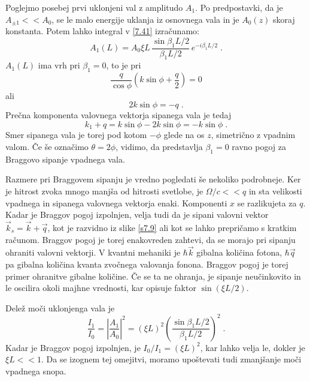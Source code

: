 \documentclass[11pt,fleqn]{book} %
\begin{document}
Poglejmo posebej prvi uklonjeni val z amplitudo $A_{1}$. Po predpostavki,
da je $A_{\pm1}<<A_{0}$, se le malo energije uklanja iz osnovnega
vala in je $A_{0}(z)$ skoraj konstanta. Potem lahko integral v \ref{7.41}
izračunamo: 
\begin{equation}
A_{1}(L)=A_{0}\xi L\,\frac{\sin\beta_{1}L/2}{\beta_{1}L/2}\, e^{-i\beta_{1}L/2}\;.\label{7.41}
\end{equation}
 $A_{1}(L)$ ima vrh pri $\beta_{1}=0$, to je pri 
\begin{equation}
\frac{q}{\cos\phi}(k\sin\phi+\frac{q}{2})=0\label{7.42}
\end{equation}
 ali 
\begin{equation}
2k\sin\phi=-q\;.\label{7.43}
\end{equation}
 Prečna komponenta valovnega vektorja sipanega vala je tedaj 
\begin{equation}
k_{1}+q=k\sin\phi-2k\sin\phi=-k\sin\phi\;.\label{7.44}
\end{equation}
 Smer sipanega vala je torej pod kotom $-\phi$ glede na os $z$,
simetrično z vpadnim valom. Če še označimo $\theta=2\phi$, vidimo,
da predstavlja $\beta_{1}=0$ ravno pogoj za Braggovo sipanje vpadnega
vala.

Razmere pri Braggovem sipanju je vredno pogledati še nekoliko podrobneje.
Ker je hitrost zvoka mnogo manjša od hitrosti svetlobe, je $\Omega/c<<q$
in sta velikosti vpadnega in sipanega valovnega vektorja enaki. Komponenti
$x$ se razlikujeta za $q$. Kadar je Braggov pogoj izpolnjen, velja
tudi da je sipani valovni vektor $\vec{k}_{s}=\vec{k}+\vec{q}$, kot
je razvidno iz slike \ref{s7.9} ali kot se lahko prepričamo s kratkim
računom. Braggov pogoj je torej enakovreden zahtevi, da se morajo
pri sipanju ohraniti valovni vektorji. V kvantni mehaniki je $\hbar\vec{k}$
gibalna količina fotona, $\hbar\vec{q}$ pa gibalna količina kvanta
zvočnega valovanja fonona. Braggov pogoj je torej primer ohranitve
gibalne količine. Če se ta ne ohranja, je sipanje neučinkovito in
le oscilira okoli majhne vrednosti, kar opisuje faktor $\sin(\xi L/2)$.

Delež moči uklonjenga vala je 
\begin{equation}
\frac{I_{1}}{I_{0}}=\left|\frac{A_{1}}{A_{0}}\right|^{2}=(\xi L)^{2}\left(\frac{\sin\beta_{1}L/2}{\beta_{1}L/2}\right)^{2}\;.\label{7.45}
\end{equation}
 Kadar je Braggov pogoj izpolnjen, je $I_{0}/I_{1}=(\xi L)^{2}$,
kar lahko velja le, dokler je $\xi L<<1$. Da se izognem tej omejitvi,
moramo upoštevati tudi zmanjšanje moči vpadnega snopa.
\end{document}
